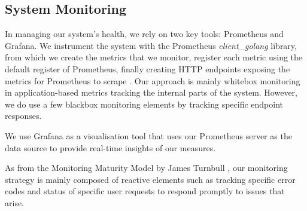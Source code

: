 

\subsection{System Monitoring}


In managing our system's health, we rely on two key tools: Prometheus and Grafana. 
We instrument the system with the Prometheus \textit{client\_golang} library, from which we create the metrics that we monitor, register each metric using the default register of Prometheus, finally creating HTTP endpoints exposing the metrics for Prometheus to scrape \cite{prometheusGolang}. 
Our approach is mainly whitebox monitoring in application-based metrics tracking the internal parts of the system. 
However, we do use a few blackbox monitoring elements by tracking specific endpoint responses. 

We use Grafana as a visualisation tool that uses our Prometheus server as the data source to provide real-time insights of our measures.

As from the Monitoring Maturity Model by James Turnbull \cite{MonitoringMaturityModel}, our monitoring strategy is mainly composed of reactive elements such as tracking specific error codes and status of specific user requests to respond promptly to issues that arise.



